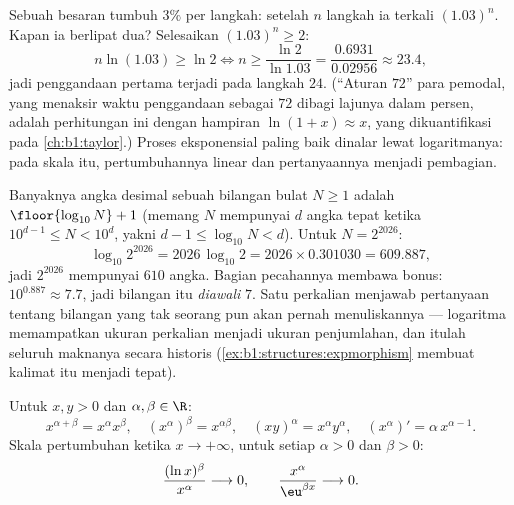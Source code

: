 \begin{example}\label{ex:b1:functions:doubling}
Sebuah besaran tumbuh $3\%$ per langkah: setelah $n$ langkah ia
terkali $(1.03)^n$. Kapan ia berlipat dua? Selesaikan $(1.03)^n
\geq 2$:
\[
n\ln(1.03) \geq \ln2
\iff n \geq \frac{\ln 2}{\ln 1.03}
= \frac{0.6931}{0.02956} \approx 23.4 ,
\]
jadi penggandaan pertama terjadi pada langkah $24$. (``Aturan $72$''
para pemodal, yang menaksir waktu penggandaan sebagai
$72$ dibagi lajunya dalam persen, adalah perhitungan ini dengan
hampiran $\ln(1 + x) \approx x$, yang dikuantifikasi pada
\cref{ch:b1:taylor}.) Proses eksponensial
paling baik dinalar lewat logaritmanya: pada
skala itu, pertumbuhannya linear dan pertanyaannya menjadi pembagian.
\end{example}

\begin{example}\label{ex:b1:functions:digits}
Banyaknya angka desimal sebuah bilangan bulat $N \geq 1$ adalah
$\floor{\log_{10} N} + 1$ (memang $N$ mempunyai $d$ angka tepat ketika
$10^{d-1} \leq N < 10^d$, yakni $d - 1 \leq \log_{10}N < d$). Untuk
$N = 2^{2026}$:
\[
\log_{10} 2^{2026} = 2026\,\log_{10}2
= 2026 \times 0.301030 = 609.887 ,
\]
jadi $2^{2026}$ mempunyai $610$ angka. Bagian pecahannya membawa
bonus: $10^{0.887} \approx 7.7$, jadi bilangan itu \emph{diawali}
$7$. Satu perkalian menjawab pertanyaan tentang bilangan yang tak
seorang pun akan pernah menuliskannya --- logaritma memampatkan ukuran
perkalian menjadi ukuran penjumlahan, dan itulah seluruh maknanya secara historis
(\cref{ex:b1:structures:expmorphism} membuat kalimat itu menjadi tepat).
\end{example}

\begin{proposition}\label{prop:b1:functions:powerrules}
Untuk $x, y > 0$ dan $\alpha, \beta \in \R$:
\[
x^{\alpha+\beta} = x^\alpha x^\beta, \quad
(x^\alpha)^\beta = x^{\alpha\beta}, \quad
(xy)^\alpha = x^\alpha y^\alpha, \quad
(x^\alpha)' = \alpha\, x^{\alpha - 1}.
\]
Skala pertumbuhan ketika $x \to +\infty$, untuk setiap
$\alpha > 0$ dan $\beta > 0$:
\[
\frac{(\ln x)^\beta}{x^\alpha} \longrightarrow 0,
\qquad
\frac{x^\alpha}{\eu^{\beta x}} \longrightarrow 0 .
\]
\end{proposition}

